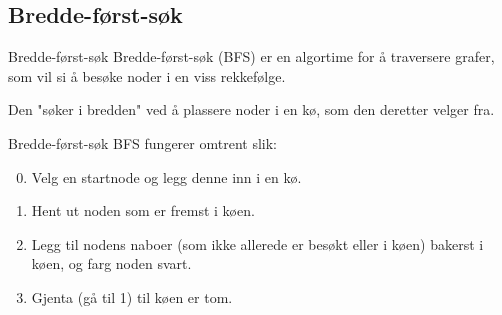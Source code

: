 \documentclass[14pt]{beamer}
\begin{document}
\subsection{Bredde-først-søk}
\begin{frame}{Bredde-først-søk}
    Bredde-først-søk (BFS) er en algortime for å traversere grafer, som vil si å besøke noder i en viss rekkefølge.

    \pause

    Den "søker i bredden" ved å plassere noder i en kø, som den deretter velger fra.
\end{frame}
\begin{frame}{Bredde-først-søk}
    BFS fungerer omtrent slik:

    \begin{enumerate}
        \setcounter{enumi}{-1}
        \item<2-> Velg en startnode og legg denne inn i en kø.
        \item<3-> Hent ut noden som er fremst i køen.
        \item<4-> Legg til nodens naboer (som ikke allerede er besøkt eller i køen) bakerst i køen, og farg noden svart.
        \item<5-> Gjenta (gå til 1) til køen er tom.
    \end{enumerate}
\end{frame}
\end{document}
